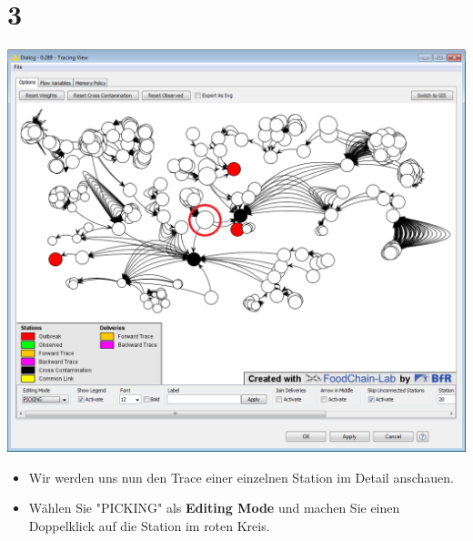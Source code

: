 \documentclass{beamer}
\begin{document}
\section{3}
\begin{frame}
	\begin{center}
  		\includegraphics[height=0.6\textheight]{3.png}
	\end{center}
	\begin{itemize}
		\item Wir werden uns nun den Trace einer einzelnen Station im Detail anschauen.
		\item Wählen Sie "PICKING" als \textbf{Editing Mode} und machen Sie einen Doppelklick auf die Station im roten Kreis.
	\end{itemize}
\end{frame}
\end{document}
